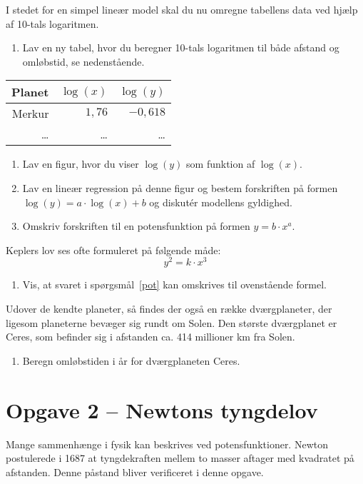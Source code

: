 \documentclass[12pt,oneside,a4paper]{article}
\theoremstyle{plain}
\begin{document}
I stedet for en simpel lineær model skal du nu omregne tabellens data ved hjælp af 
10-tals logaritmen.
\begin{enumerate}[label=(\alph*) ,resume]
    \item Lav en ny tabel, hvor du beregner 10-tals logaritmen til både afstand
        og omløbstid, se nedenstående.
\end{enumerate}

\begin{center}
\begin{tabular}{r|r|r}
    \hline
    Planet  & $\log(x)$   & $\log(y)$ \\
    \hline 
    Merkur  &  $1,76$ &   $-0,618$ \\
    \ldots  & \ldots    & \ldots  \\
    \hline 
\end{tabular}
\end{center}

\begin{enumerate}[label=(\alph*) ,resume]
    \item Lav en figur, hvor du viser $\log(y)$ som funktion af $\log(x)$.
    \item Lav en lineær regression på denne figur og bestem forskriften på formen
        $\log(y) = a\cdot\log(x)+b$ og diskutér modellens gyldighed.
    \item Omskriv forskriften til en potensfunktion på formen $y = b\cdot x^a$. \label{pot}
\end{enumerate}

Keplers lov ses ofte formuleret på følgende måde:
$$
y^2 = k \cdot x^3
$$
\begin{enumerate}[label=(\alph*) ,resume]
    \item Vis, at svaret i spørgsmål~\ref{pot} kan omskrives til ovenstående formel.
\end{enumerate}


Udover de kendte planeter, så findes der også en række dværgplaneter, der
ligesom planeterne bevæger sig rundt om Solen. Den største dværgplanet er
Ceres, som befinder sig i afstanden ca. 414 millioner km fra Solen.

\begin{enumerate}[label=(\alph*) ,resume]
    \item Beregn omløbstiden i år for dværgplaneten Ceres.
\end{enumerate}

\section*{Opgave 2 -- Newtons tyngdelov}
Mange sammenhænge i fysik kan beskrives ved potensfunktioner. Newton
postulerede i 1687 at tyngdekraften mellem to masser aftager med kvadratet på
afstanden.  Denne påstand bliver verificeret i denne opgave.
\end{document}
